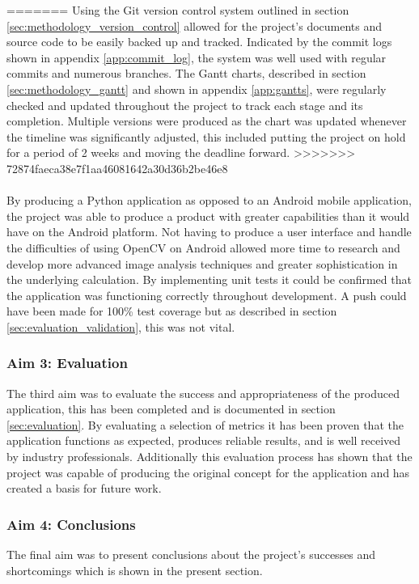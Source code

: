 =======
			Using the Git version control system outlined in section \ref{sec:methodology_version_control} allowed for the project's documents and source code to be easily backed up and tracked. Indicated by the commit logs shown in appendix \ref{app:commit_log}, the system was well used with regular commits and numerous branches. The Gantt charts, described in section \ref{sec:methodology_gantt} and shown in appendix \ref{app:gantts}, were regularly checked and updated throughout the project to track each stage and its completion. Multiple versions were produced as the chart was updated whenever the timeline was significantly adjusted, this included putting the project on hold for a period of 2 weeks and moving the deadline forward.
>>>>>>> 72874faeca38e7f1aa46081642a30d36b2be46e8
			\\\\
			By producing a Python application as opposed to an Android mobile application, the project was able to produce a product with greater capabilities than it would have on the Android platform. Not having to produce a user interface and handle the difficulties of using OpenCV on Android allowed more time to research and develop more advanced image analysis techniques and greater sophistication in the underlying calculation. By implementing unit tests it could be confirmed that the application was functioning correctly throughout development. A push could have been made for 100\% test coverage but as described in section \ref{sec:evaluation_validation}, this was not vital.
		\subsubsection{Aim 3: Evaluation}
			The third aim was to evaluate the success and appropriateness of the produced application, this has been completed and is documented in section \ref{sec:evaluation}. By evaluating a selection of metrics it has been proven that the application functions as expected, produces reliable results, and is well received by industry professionals. Additionally this evaluation process has shown that the project was capable of producing the original concept for the application and has created a basis for future work.
		\subsubsection{Aim 4: Conclusions}
			The final aim was to present conclusions about the project's successes and shortcomings which is shown in the present section.
